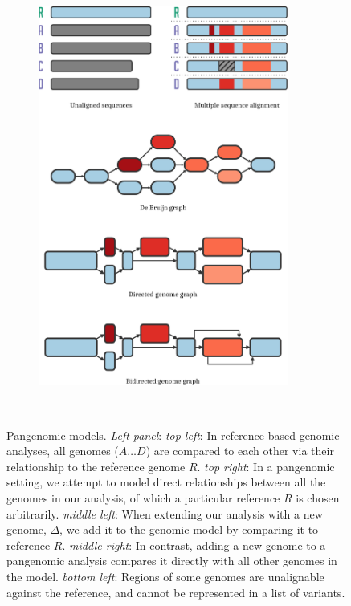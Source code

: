 \begin{figure}[p]
\begin{subfigure}[b]{0.5\textwidth}
    \includegraphics[width=0.9\textwidth]{figures/data_structures.pdf}
    \centering
  \end{subfigure}
  \\
  \caption{
    \label{fig:models}
    Pangenomic models.
    \underline{\emph{Left panel}}:
    \textit{top left}: In reference based genomic analyses, all genomes ($A \ldots D$) are compared to each other via their relationship to the reference genome $R$.
    \textit{top right}: In a pangenomic setting, we attempt to model direct relationships between all the genomes in our analysis, of which a particular reference $R$ is chosen arbitrarily.
    \textit{middle left}: When extending our analysis with a new genome, $\Delta$, we add it to the genomic model by comparing it to reference $R$.
    \textit{middle right}: In contrast, adding a new genome to a pangenomic analysis compares it directly with all other genomes in the model.
    \textit{bottom left}: Regions of some genomes are unalignable against the reference, and cannot be represented in a list of variants.
}
\end{figure}
